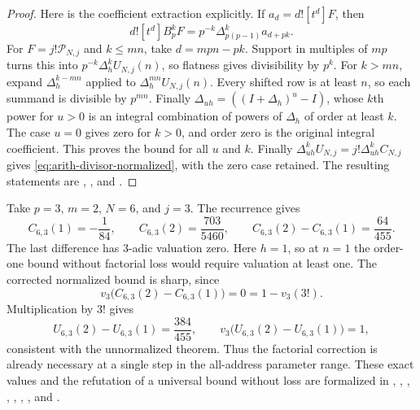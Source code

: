 \begin{proof}
Here is the coefficient extraction explicitly. If $a_d=d![t^d]F$,
then
\[
 d![t^d]B_p^kF=p^{-k}\Delta_{p(p-1)}^ka_{d+pk}.
\]
For $F=j!\mathcal P_{N,j}$ and $k\le mn$, take $d=mpn-pk$.
Support in multiples of $mp$ turns this into
$p^{-k}\Delta_h^kU_{N,j}(n)$, so flatness gives divisibility by $p^k$.
For $k>mn$, expand $\Delta_h^{k-mn}$ applied to
$\Delta_h^{mn}U_{N,j}(n)$. Every shifted row is at least $n$, so
each summand is divisible by $p^{mn}$. Finally
$\Delta_{uh}=((I+\Delta_h)^u-I)$, whose $k$th power for $u>0$
is an integral combination of powers of $\Delta_h$ of order at least $k$.
The case $u=0$ gives zero for $k>0$, and order zero is the original
integral coefficient. This proves the bound for all $u$ and $k$.
Finally $\Delta_{uh}^kU_{N,j}=j!\Delta_{uh}^kC_{N,j}$ gives
\eqref{eq:arith-divisor-normalized}, with the zero case retained.
The resulting statements are
,
, and
.
\end{proof}

\begin{example}
\label{ex:arith-normalization-loss}
Take $p=3$, $m=2$, $N=6$, and $j=3$.  The recurrence gives
\[
 C_{6,3}(1)=-\frac1{84},\qquad
 C_{6,3}(2)=\frac{703}{5460},\qquad
 C_{6,3}(2)-C_{6,3}(1)=\frac{64}{455}.
\]
The last difference has $3$-adic valuation zero.  Here $h=1$, so at
$n=1$ the order-one bound without factorial loss would require valuation
at least one.  The corrected normalized bound is sharp, since
\[
 v_3\bigl(C_{6,3}(2)-C_{6,3}(1)\bigr)=0=1-v_3(3!).
\]
Multiplication by $3!$ gives
\[
 U_{6,3}(2)-U_{6,3}(1)=\frac{384}{455},\qquad
 v_3\bigl(U_{6,3}(2)-U_{6,3}(1)\bigr)=1,
\]
consistent with the unnormalized theorem.  Thus the factorial correction
is already necessary at a single step in the all-address parameter range.
These exact values and the refutation of a universal bound without loss
are formalized in
,
,
,
,
,
,
, and
.
\end{example}

